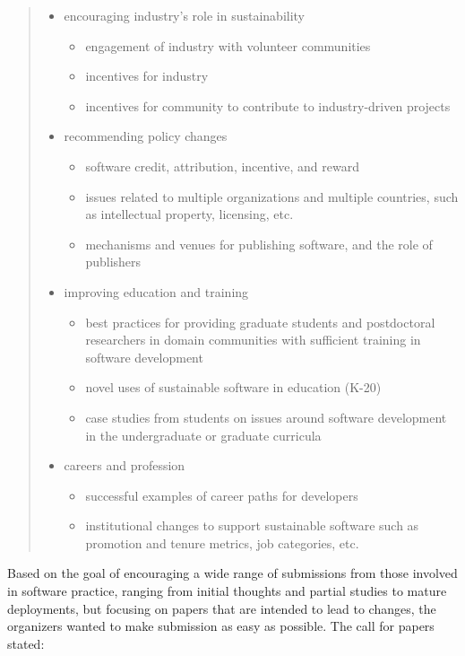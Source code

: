 \documentclass[11pt, oneside]{amsart}
\begin{document}
\begin{quote}
\begin{itemize}
\item encouraging industry's role in sustainability
\begin{itemize}
\item engagement of industry with volunteer communities
\item incentives for industry
\item incentives for community to contribute to industry-driven projects
\end{itemize}

\item recommending policy changes
\begin{itemize}
\item software credit, attribution, incentive, and reward
\item issues related to multiple organizations and multiple countries, such as intellectual property, licensing, etc.
\item mechanisms and venues for publishing software, and the role of publishers
\end{itemize}

\item improving education and training
\begin{itemize}
\item best practices for providing graduate students and postdoctoral researchers in domain communities with sufficient training in software development
\item novel uses of sustainable software in education (K-20)
\item case studies from students on issues around software development in the undergraduate or graduate curricula
\end{itemize}

\item careers and profession
\begin{itemize}
\item successful examples of career paths for developers
\item institutional changes to support sustainable software such as promotion and tenure metrics, job categories, etc.
\end{itemize}

\end{itemize}

\end{quote}

Based on the goal of encouraging a wide range of submissions from those involved in software practice, ranging from initial thoughts and partial studies to mature deployments, but focusing on papers that are intended to lead to changes, the organizers wanted to make submission as easy as possible.  The call for papers stated:
\end{document}
